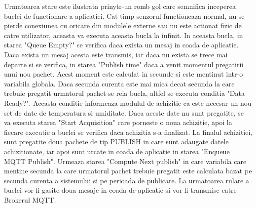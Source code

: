 Urmatoarea stare este ilustrata prinytr-un romb gol care semnifica inceperea buclei de functionare a aplicatiei. Cat timp senzorul functioneaza normal, nu se pierde 
conexiunea cu oricare din modulele externe sau nu este actionat fizic de catre utilizator, aceasta va executa aceasta bucla la infinit. In aceasta bucla, in starea 
"Queue Empty?" se verifica daca exista un mesaj in coada de aplicatie. Daca exista un mesaj acesta este transmis, iar daca nu exista se trece mai departe si se verifica, 
in starea "Publish time" daca a venit momentul pregatirii unui nou pachet. Acest moment este calculat in secunde si este mentinut intr-o variabila globala. Daca 
secunda curenta este mai mica decat secunda la care trebuie pregatit urmatorul pachet se reia bucla, altfel se executa conditia "Data Ready?". Aceasta conditie 
informeaza modulul de achizitie ca este necesar un nou set de date de temperatura si umiditate. Daca aceste date nu sunt pregatite, se va executa starea "Start Acquisition" 
care porneste o noua achizitie, apoi la fiecare executie a buclei se verifica daca achizitia s-a finalizat. La finalul achizitiei, sunt pregatite doua pachete de tip 
PUBLISH in care sunt adaugate datele achizitionate, iar apoi sunt urcate in coada de aplicatie in starea "Enqueue MQTT Publish". Urmeaza starea "Compute Next publish" 
in care variabila care mentine secunda la care urmatorul pachet trebuie pregatit este calculata bazat pe secunda curenta a sistemului si pe perioada de publicare. La 
urmatoarea rulare a buclei vor fi gasite doua mesaje in coada de aplicatie si vor fi transmise catre Brokerul MQTT.

